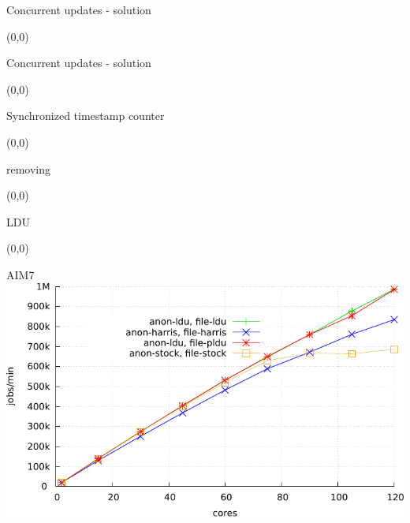 \documentclass[english]{beamer} %
\begin{document}
\begin{frame}{Concurrent updates - solution}
\begin{textblock}{1}(0,0)
\end{textblock}
\end{frame}


\begin{frame}{Concurrent updates - solution}
\begin{textblock}{1}(0,0)
\end{textblock}
\end{frame}




\begin{frame}{Synchronized timestamp counter}
\begin{textblock}{1}(0,0)
\end{textblock}
\end{frame}



\begin{frame}{removing}
\begin{textblock}{1}(0,0)
\end{textblock}
\end{frame}


\begin{frame}{LDU}
\begin{textblock}{1}(0,0)
\end{textblock}
\end{frame}



\begin{frame}{AIM7}
\includegraphics[width=\textwidth,height=0.8\textheight,
keepaspectratio]{aim7}
\end{frame}
\end{document}
